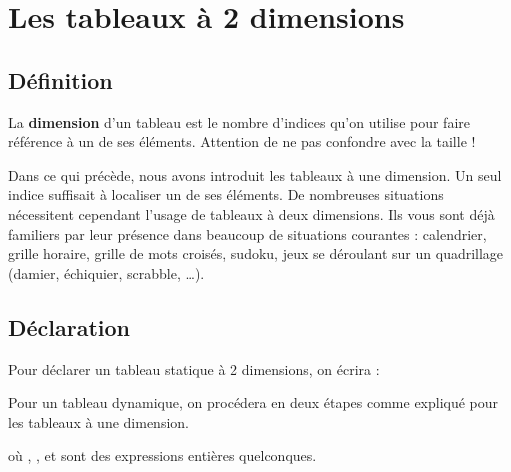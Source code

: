 \chapter{Les tableaux à 2 dimensions}

\section{Définition}

	La \textbf{dimension} d’un tableau est le nombre d’indices qu’on utilise
	pour faire référence à un de ses éléments. Attention de ne pas confondre 
	avec la	taille !
	
	Dans ce qui précède, nous avons introduit les tableaux à une dimension.
	Un seul indice suffisait à localiser un de ses éléments. De nombreuses
	situations nécessitent cependant l’usage de tableaux à deux dimensions.
	Ils vous sont déjà familiers par leur présence dans beaucoup de
	situations courantes : calendrier, grille horaire, grille de mots
	croisés, sudoku, jeux se déroulant sur un quadrillage (damier,
	échiquier, scrabble, \dots).

\section{Déclaration}

	Pour déclarer un tableau statique à 2 dimensions, on écrira :

	
	Pour un tableau dynamique, on procédera en deux étapes comme expliqué
	pour les tableaux à une dimension. 
	

	où , , 
	 et sont des
	expressions entières quelconques.


